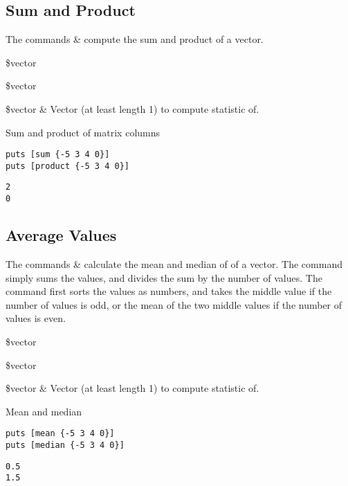 \documentclass{article}
\begin{document}
\subsection{Sum and Product}
The commands  \&  compute the sum and product of a vector.
\begin{syntax}
 \$vector 
\end{syntax}
\begin{syntax}
  \$vector 
\end{syntax}
\begin{args}
\$vector & Vector (at least length 1) to compute statistic of. 
\end{args}
\begin{example}{Sum and product of matrix columns}
\begin{lstlisting}
puts [sum {-5 3 4 0}]
puts [product {-5 3 4 0}]
\end{lstlisting}
\tcblower
\begin{lstlisting}
2
0
\end{lstlisting}
\end{example}
\subsection{Average Values}
The commands  \&  calculate the mean and median of of a vector. The command  simply sums the values, and divides the sum by the number of values. The command  first sorts the values as numbers, and takes the middle value if the number of values is odd, or the mean of the two middle values if the number of values is even. 
\begin{syntax}
 \$vector 
\end{syntax}
\begin{syntax}
 \$vector 
\end{syntax}
\begin{args}
\$vector & Vector (at least length 1) to compute statistic of. 
\end{args}
\begin{example}{Mean and median}
\begin{lstlisting}
puts [mean {-5 3 4 0}]
puts [median {-5 3 4 0}]
\end{lstlisting}
\tcblower
\begin{lstlisting}
0.5
1.5
\end{lstlisting}
\end{example}
\clearpage
\end{document}
